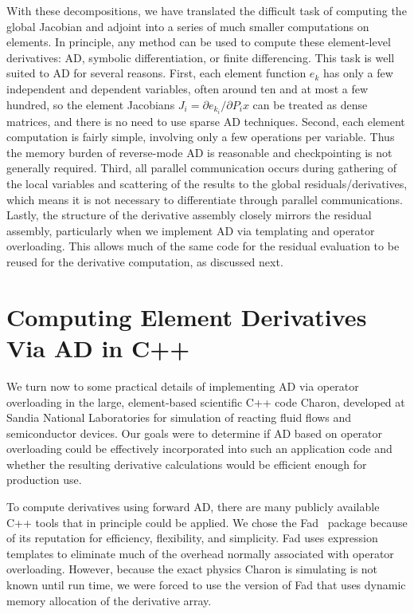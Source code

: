 \documentclass{llncs}
\begin{document}
With these decompositions, we have translated the difficult task of
computing the global Jacobian and adjoint into a series of much
smaller computations on elements.  In principle,
any method can be used to compute these element-level derivatives:
AD, symbolic differentiation, or finite
differencing.  This task is well suited to AD
for several reasons.  First, each element function $e_k$
has only a few independent and dependent variables,
often around ten and at most a few hundred, so the element
Jacobians $J_i = \partial e_{k_i} / \partial P_i x$
can be treated as dense matrices, and there is no need to use sparse AD techniques.
Second, each element computation is fairly simple,
involving only a few operations per variable.  Thus
the memory burden of reverse-mode AD is reasonable and
checkpointing is not generally required.  Third, all parallel
communication occurs during gathering of the local variables and
scattering of the results to the global residuals/derivatives, which
means it is not necessary to differentiate through parallel
communications.  Lastly, the structure of the derivative assembly
closely mirrors the residual assembly, particularly when we implement
AD via templating and operator overloading.  This allows much of the same code
for the residual evaluation to be reused for the derivative computation,
as discussed next.

\section{Computing Element Derivatives Via AD in C++}
\label{sect:AD}

We turn now to some practical details of implementing AD via
operator overloading in the large, element-based scientific C++ code
Charon, developed at Sandia National Laboratories
for simulation of reacting fluid flows and
semiconductor devices.  Our goals were to determine if
AD based on operator overloading could be effectively incorporated into
such an application code and whether the resulting derivative
calculations would be efficient enough for production use.

To compute derivatives using forward AD, there are many publicly
available C++ tools that in principle could be applied.  We chose the
Fad~\cite{Aubert2001ADi} package because of its reputation for
efficiency, flexibility, and simplicity.  Fad uses expression
templates to eliminate much of the overhead normally associated with
operator overloading.  However, because the exact physics Charon is
simulating is not known until run time, we were forced to use the
version of Fad that uses dynamic memory allocation of the derivative array.
\end{document}
